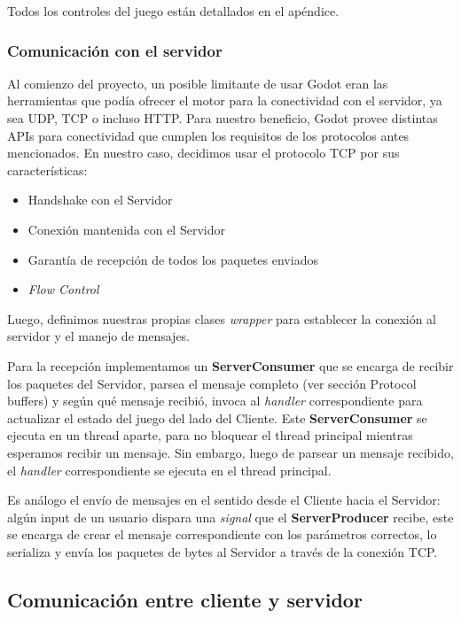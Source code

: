 Todos los controles del juego están detallados en el apéndice.


\subsubsection{Comunicación con el servidor}

\noindent Al comienzo del proyecto, un posible limitante de usar Godot eran las herramientas que podía ofrecer 
el motor para la conectividad con el servidor, ya sea UDP, TCP o incluso HTTP. 
Para nuestro beneficio, Godot provee distintas APIs para conectividad que cumplen los requisitos
de los protocolos antes mencionados. En nuestro caso, decidimos usar el protocolo TCP por sus características:
\begin{itemize}
    \item Handshake con el Servidor
    \item Conexión mantenida con el Servidor
    \item Garantía de recepción de todos los paquetes enviados
    \item \textit{Flow Control}
\end{itemize}

Luego, definimos nuestras propias clases \textit{wrapper} para establecer la conexión al servidor y el 
manejo de mensajes. 

Para la recepción implementamos un \textbf{ServerConsumer} que se encarga de recibir los paquetes 
del Servidor, parsea el mensaje completo (ver sección Protocol buffers) y según qué mensaje recibió, 
invoca al \textit{handler} correspondiente para actualizar el estado del juego del lado del Cliente.
Este \textbf{ServerConsumer} se ejecuta en un thread aparte, para no bloquear el thread principal mientras
esperamos recibir un mensaje. Sin embargo, luego de parsear un mensaje recibido, el \textit{handler}
correspondiente se ejecuta en el thread principal.

Es análogo el envío de mensajes en el sentido desde el Cliente hacia el Servidor: algún input de un 
usuario dispara una \textit{signal} que el \textbf{ServerProducer} recibe, este se encarga de crear 
el mensaje correspondiente con los parámetros correctos, lo serializa y envía los paquetes de bytes 
al Servidor a través de la conexión TCP.

\subsection{Comunicación entre cliente y servidor}

